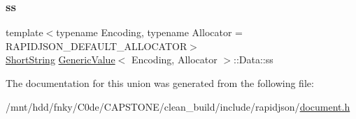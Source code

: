 \mbox{\label{unionGenericValue_1_1Data_a410e39a5dc296eb3b152b54193740e4c}} 
\subsubsection{\texorpdfstring{ss}{ss}}
{\footnotesize\ttfamily template$<$typename Encoding, typename Allocator = R\+A\+P\+I\+D\+J\+S\+O\+N\+\_\+\+D\+E\+F\+A\+U\+L\+T\+\_\+\+A\+L\+L\+O\+C\+A\+T\+OR$>$ \\
\hyperlink{structGenericValue_1_1ShortString}{Short\+String} \hyperlink{classGenericValue}{Generic\+Value}$<$ Encoding, Allocator $>$\+::Data\+::ss}



The documentation for this union was generated from the following file\+:\begin{DoxyCompactItemize}
\item 
/mnt/hdd/fnky/\+C0de/\+C\+A\+P\+S\+T\+O\+N\+E/clean\+\_\+build/include/rapidjson/\hyperlink{document_8h}{document.\+h}\end{DoxyCompactItemize}
